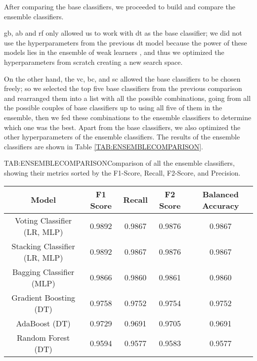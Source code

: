 After comparing the base classifiers, we proceeded to build and compare the ensemble classifiers.

\acl{gb}, \acl{ab} and \acl{rf} only allowed us to work with \acl{dt} as the base classifier; we did not use the hyperparameters from the previous \ac{dt} model because the power of these models lies in the ensemble of weak learners \cite{mannor_existence_2002}, and thus we optimized the hyperparameters from scratch creating a new search space.

On the other hand, the \acl{vc}, \acl{bc}, and \acl{sc} allowed the base classifiers to be chosen freely; so we selected the top five base classifiers from the previous comparison and rearranged them into a list with all the possible combinations, going from all the possible couples of base classifiers up to using all five of them in the ensemble, then we fed these combinations to the ensemble classifiers to determine which one was the best. Apart from the base classifiers, we also optimized the other hyperparameters of the ensemble classifiers. The results of the ensemble classifiers are shown in Table \ref{TAB:ENSEMBLECOMPARISON}.

\begin{table}[Ensemble Classifiers Comparison]{TAB:ENSEMBLECOMPARISON}{Comparison of all the ensemble classifiers, showing their metrics sorted by the F1-Score, Recall, F2-Score, and Precision.}
    \begin{tabular}{|c|c|c|c|c|}
        \hline
        \textbf{Model} & \textbf{F1 Score} & \textbf{Recall} & \textbf{F2 Score} & \textbf{Balanced Accuracy} \\
        \hline
        Voting Classifier (LR, MLP)        & 0.9892 & 0.9867 & 0.9876 & 0.9867 \\
        Stacking Classifier (LR, MLP)      & 0.9892 & 0.9867 & 0.9876 & 0.9867 \\
        Bagging Classifier (MLP)           & 0.9866 & 0.9860 & 0.9861 & 0.9860 \\
        Gradient Boosting (DT)             & 0.9758 & 0.9752 & 0.9754 & 0.9752 \\
        AdaBoost (DT)                      & 0.9729 & 0.9691 & 0.9705 & 0.9691 \\
        Random Forest (DT)                 & 0.9594 & 0.9577 & 0.9583 & 0.9577 \\
        \hline
    \end{tabular}
\end{table}

